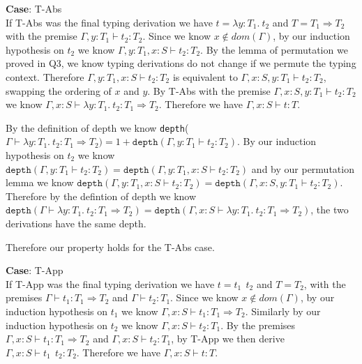\documentclass[12pt, fleqn]{article}
\begin{document}
\medskip
\textbf{Case}: T-Abs\\
If T-Abs was the final typing derivation we have $t = \lambda y: T_1.\:t_2$ and $T = T_1 \Rightarrow T_2$ with the premise
$\Gamma, y: T_1 \vdash t_2 : T_2$. Since we know $x \notin dom(\Gamma)$, by our induction hypothesis on $t_2$ we know
$\Gamma, y: T_1, x: S \vdash t_2: T_2$. By the lemma of permutation we proved in Q3, we know typing derivations do not change if
we permute the typing context. Therefore $\Gamma, y: T_1, x: S \vdash t_2: T_2$ is equivalent to $\Gamma, x: S, y: T_1 \vdash t_2: T_2$,
swapping the ordering of $x$ and $y$. By T-Abs with the premise $\Gamma, x: S, y: T_1 \vdash t_2: T_2$ we know 
$\Gamma, x:S \vdash \lambda y: T_1.\:t_2 : T_1 \Rightarrow T_2$. Therefore we have $\Gamma, x: S \vdash t : T$.

By the definition of depth we know \texttt{depth}($\Gamma \vdash \lambda y : T_1 . \: t_2 : T_1 \Rightarrow T_2) =  1 + 
\texttt{depth}(\Gamma, y: T_1 \vdash t_2: T_2)$. By our induction hypothesis on $t_2$ we know 
$\texttt{depth}(\Gamma, y: T_1 \vdash t_2: T_2) = \texttt{depth}(\Gamma, y: T_1, x: S \vdash t_2: T_2)$
and by our permutation lemma we know $\texttt{depth}(\Gamma, y: T_1, x: S \vdash t_2: T_2) = \texttt{depth}(\Gamma, x: S, y: T_1 \vdash t_2: T_2)$.
Therefore by the defintion of depth
we know $\texttt{depth}(\Gamma \vdash \lambda y : T_1 . \: t_2 : T_1 \Rightarrow T_2) = \texttt{depth}(\Gamma, x: S \vdash \lambda y : T_1 . \: t_2 : T_1 \Rightarrow T_2)$,
the two derivations have the same depth.

Therefore our property holds for the T-Abs case.

\medskip
\textbf{Case}: T-App\\
If T-App was the final typing derivation we have $t = t_1\:\:t_2$ and $T = T_2$, with the premises $\Gamma \vdash t_1 : T_1 \Rightarrow T_2$
and $\Gamma \vdash t_2 : T_1$. Since we know $x \notin dom(\Gamma)$, by our induction hypothesis on $t_1$ we know 
$\Gamma, x: S \vdash t_1 : T_1 \Rightarrow T_2$. Similarly by our induction hypothesis on $t_2$ we know $\Gamma, x: S
\vdash t_2 : T_1$. By the premises $\Gamma, x: S \vdash t_1 : T_1 \Rightarrow T_2$ and $\Gamma, x: S \vdash t_2 : T_1$,
by T-App we then derive $\Gamma, x: S \vdash t_1\:\:t_2 : T_2$. Therefore we have $\Gamma, x: S \vdash t : T$.
\end{document}
